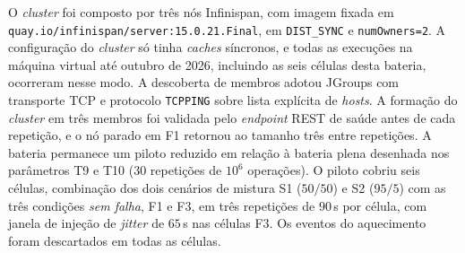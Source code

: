 O \emph{cluster} foi composto por três nós Infinispan, com imagem fixada em \texttt{quay.io/infinispan/server:15.0.21.Final}, em \texttt{DIST\_SYNC} e \texttt{numOwners=2}. A configuração do \emph{cluster} só tinha \emph{caches} síncronos, e todas as execuções na máquina virtual até outubro de 2026, incluindo as seis células desta bateria, ocorreram nesse modo. A descoberta de membros adotou JGroups com transporte TCP e protocolo \texttt{TCPPING} sobre lista explícita de \emph{hosts}. A formação do \emph{cluster} em três membros foi validada pelo \emph{endpoint} REST de saúde antes de cada repetição, e o nó parado em F1 retornou ao tamanho três entre repetições. A bateria permanece um piloto reduzido em relação à bateria plena desenhada nos parâmetros T9 e T10 (30 repetições de $10^6$ operações). O piloto cobriu seis células, combinação dos dois cenários de mistura S1 ($50/50$) e S2 ($95/5$) com as três condições \emph{sem falha}, F1 e F3, em três repetições de $90$\,s por célula, com janela de injeção de \emph{jitter} de $65$\,s nas células F3. Os eventos do aquecimento foram descartados em todas as células.

